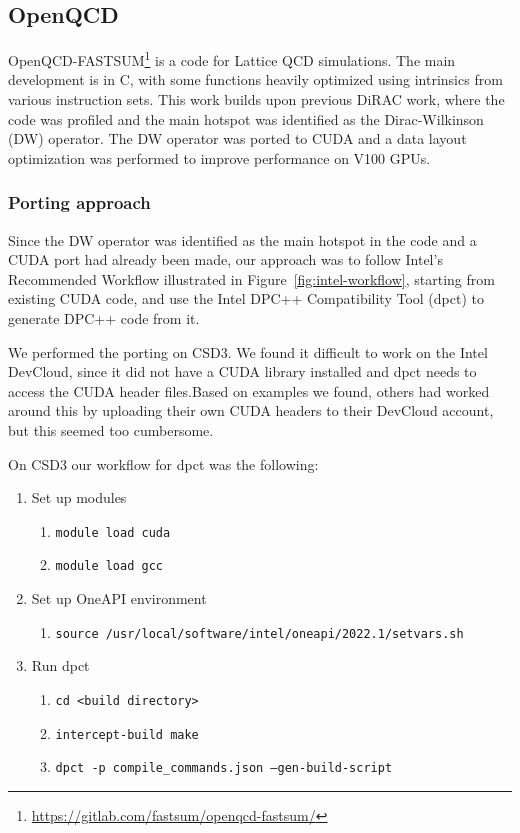 \documentclass[../main]{subfiles}
\begin{document}
\subsection{OpenQCD}\label{sec:openqcd}

OpenQCD-FASTSUM\footnote{\url{https://gitlab.com/fastsum/openqcd-fastsum/}} is a code for Lattice QCD simulations.
The main development is in C, with some functions heavily optimized using intrinsics from various instruction sets.
This work builds upon previous DiRAC work, where the code was profiled and the main hotspot was identified as the Dirac-Wilkinson (DW) operator.
The DW operator was ported to CUDA and a data layout optimization was performed to improve performance on V100 GPUs.

\subsubsection{Porting approach}\label{sec:openqcd_porting}

Since the DW operator was identified as the main hotspot in the code and a CUDA port had already been made, our approach was to follow Intel's Recommended Workflow illustrated in Figure~\ref{fig:intel-workflow}, starting from existing CUDA code, and use the Intel DPC++ Compatibility Tool (dpct) to generate DPC++ code from it.

We performed the porting on CSD3.
We found it difficult to work on the Intel DevCloud, since it did not have a CUDA library installed and dpct needs to access the CUDA header files.Based on examples we found, others had worked around this by uploading their own CUDA headers to their DevCloud account, but this seemed too cumbersome.

On CSD3 our workflow for dpct was the following:

\begin{enumerate}
	\item Set up modules
	      \begin{enumerate}
		      \item\texttt{module load cuda}
		      \item\texttt{module load gcc}
	      \end{enumerate}
	\item Set up OneAPI environment
	      \begin{enumerate}
		      \item\texttt{source /usr/local/software/intel/oneapi/2022.1/setvars.sh}
	      \end{enumerate}
	\item Run dpct
	      \begin{enumerate}
		      \item\texttt{cd <build directory>}
		      \item\texttt{intercept-build make}
		      \item\texttt{dpct -p compile\_commands.json --gen-build-script}
	      \end{enumerate}
\end{enumerate}
\end{document}
